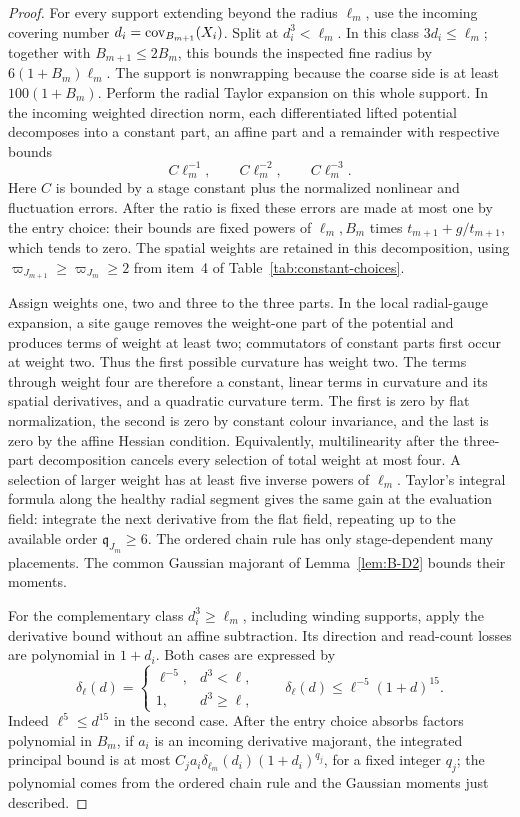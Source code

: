 \begin{proof}
For every support extending beyond the radius $\ell_m$, use the incoming covering number
$d_i=\operatorname{cov}_{B_{m+1}}(X_i)$. Split at $d_i^3<\ell_m$. In this class $3d_i\le\ell_m$; together with $B_{m+1}\le2B_m$, this bounds the inspected fine radius by $6(1+B_m)\ell_m$. The support is nonwrapping because the coarse side is at least $100(1+B_m)$. Perform the radial Taylor expansion on this whole support. In the incoming weighted direction norm, each differentiated lifted potential decomposes into a constant part, an affine part and a remainder with respective bounds
\begin{equation*}
C\ell_m^{-1},\qquad C\ell_m^{-2},\qquad C\ell_m^{-3}.
\end{equation*}
Here $C$ is bounded by a stage constant plus the normalized nonlinear and fluctuation errors. After the ratio is fixed these errors are made at most one by the entry choice: their bounds are fixed powers of $\ell_m,B_m$ times $t_{m+1}+g/t_{m+1}$, which tends to zero. The spatial weights are retained in this decomposition, using $\varpi_{J_{m+1}}\ge\varpi_{J_m}\ge2$ from item~4 of Table~\ref{tab:constant-choices}.

Assign weights one, two and three to the three parts. In the local radial-gauge expansion, a site gauge removes the weight-one part of the potential and produces terms of weight at least two; commutators of constant parts first occur at weight two. Thus the first possible curvature has weight two. The terms through weight four are therefore a constant, linear terms in curvature and its spatial derivatives, and a quadratic curvature term. The first is zero by flat normalization, the second is zero by constant colour invariance, and the last is zero by the affine Hessian condition. Equivalently, multilinearity after the three-part decomposition cancels every selection of total weight at most four. A selection of larger weight has at least five inverse powers of $\ell_m$. Taylor's integral formula along the healthy radial segment gives the same gain at the evaluation field: integrate the next derivative from the flat field, repeating up to the available order $\mathfrak q_{J_m}\ge6$. The ordered chain rule has only stage-dependent many placements. The common Gaussian majorant of Lemma~\ref{lem:B-D2} bounds their moments.

For the complementary class $d_i^3\ge\ell_m$, including winding supports, apply the derivative bound without an affine subtraction. Its direction and read-count losses are polynomial in $1+d_i$. Both cases are expressed by
\begin{equation*}
\delta_\ell(d)=
\begin{cases}\ell^{-5},&d^3<\ell,\\1,&d^3\ge\ell,\end{cases}
\qquad
\delta_\ell(d)\le\ell^{-5}(1+d)^{15}.
\end{equation*}
Indeed $\ell^5\le d^{15}$ in the second case. After the entry choice absorbs factors polynomial in $B_m$, if $a_i$ is an incoming derivative majorant, the integrated principal bound is at most
$C_j a_i\delta_{\ell_m}(d_i)(1+d_i)^{q_j}$, for a fixed integer $q_j$; the polynomial comes from the ordered chain rule and the Gaussian moments just described.


\end{proof}
